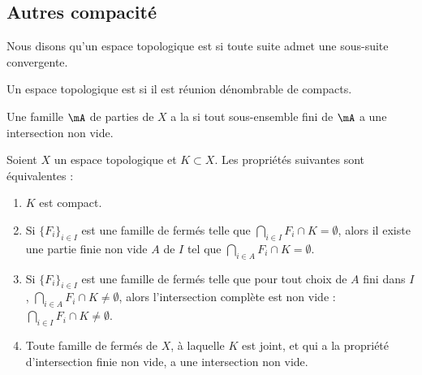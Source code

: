 \subsection{Autres compacité}

\begin{definition}        \label{DEFooTVDOooZbwOFK}
	Nous disons qu'un espace topologique est  si toute suite admet une sous-suite convergente.
\end{definition}

\begin{definition}      \label{DefFCGBooLpnSAK}
	Un espace topologique est  si il est réunion dénombrable de compacts.
\end{definition}

\begin{definition}
	Une famille \( \mA\) de parties de \( X\) a la  si tout sous-ensemble fini de \( \mA\) a une intersection non vide.
\end{definition}

\begin{proposition}\label{PropXKUMiCj}
	Soient \( X\) un espace topologique et \( K\subset X\). Les propriétés suivantes sont équivalentes :
	\begin{enumerate}
		\item\label{ItemXYmGHFai}
		\( K\) est compact.
		\item\label{ItemXYmGHFaii}
		Si \( \{ F_i \}_{i\in I}\) est une famille de fermés telle que \( \bigcap_{i\in I}F_i \cap K =\emptyset\), alors il existe une partie finie non vide \( A\) de \( I\) tel que \( \bigcap_{i\in A}F_i \cap K =\emptyset\).
		\item\label{ItemXYmGHFaiii}
		Si \( \{ F_i \}_{i\in I}\) est une famille de fermés telle que pour tout choix de \( A\) fini dans \( I\), \( \bigcap_{i\in A}F_i \cap K \neq\emptyset\), alors l'intersection complète est non vide : \( \bigcap_{i\in I}F_i \cap K\neq\emptyset\).
		\item\label{ItemXYmGHFaiv}
		Toute famille de fermés de \( X \), à laquelle \( K \) est joint, et qui a la propriété d'intersection finie non vide, a une intersection non vide.
	\end{enumerate}
\end{proposition}

